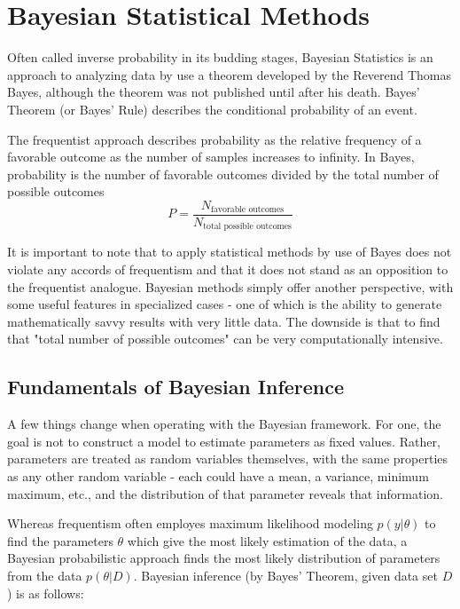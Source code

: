 \chapter{Bayesian Statistical Methods}

Often called inverse probability in its budding stages, \cite{salsburg2002lady} Bayesian Statistics is an approach to analyzing data by use a theorem developed by the Reverend Thomas Bayes, although the theorem was not published until after his death.  Bayes' Theorem (or Bayes' Rule) describes the conditional probability of an event.

The frequentist approach describes probability as the relative frequency of a favorable outcome as the number of samples increases to infinity.  In Bayes, probability is the number of favorable outcomes divided by the total number of possible outcomes \cite{gelmanbayesian3}
$$
P = \frac{N_{\text{favorable outcomes}}}{N_{\text{total possible outcomes}}}
$$

It is important to note that to apply statistical methods by use of Bayes does not violate any accords of frequentism and that it does not stand as an opposition to the frequentist analogue.  Bayesian methods simply offer another perspective, with some useful features in specialized cases - one of which is the ability to generate mathematically savvy results with very little data.  The downside is that to find that "total number of possible outcomes" can be very computationally intensive.


\section{Fundamentals of Bayesian Inference} %


A few things change when operating with the Bayesian framework.  For one, the goal is not to construct a model to estimate parameters as fixed values.  Rather, parameters are treated as random variables themselves, with the same properties as any other random variable - each could have a mean, a variance, minimum maximum, etc., and the distribution of that parameter reveals that information.

Whereas frequentism often employes maximum likelihood modeling $p(y|\theta)$ to find the parameters $\theta$ which give the most likely estimation of the data, a Bayesian probabilistic approach finds the most likely distribution of parameters from the data $p(\theta|D)$\cite{mullachery2018bayesian}.  Bayesian inference (by Bayes' Theorem, given data set $D$) is as follows:

